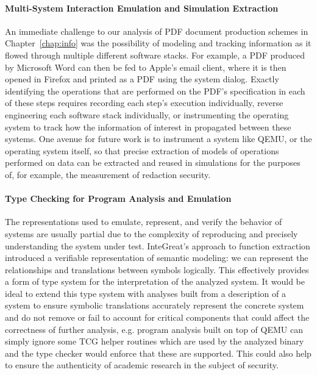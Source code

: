 \paragraph{Multi-System Interaction Emulation and Simulation Extraction}
An immediate challenge to our analysis of PDF document production schemes in Chapter~\ref{chap:info} was the possibility of modeling and tracking information as it flowed through multiple different software stacks.
For example, a PDF produced by Microsoft Word can then be fed to Apple's email client, where it is then opened in Firefox and printed as a PDF using the system dialog.
Exactly identifying the operations that are performed on the PDF's specification in each of these steps requires recording each step's execution individually, reverse engineering each software stack individually, or instrumenting the operating system to track how the information of interest in propagated between these systems.
One avenue for future work is to instrument a system like QEMU, or the operating system itself, so that precise extraction of models of operations performed on data can be extracted and reused in simulations for the purposes of, for example, the measurement of redaction security.

\paragraph{Type Checking for Program Analysis and Emulation}
The representations used to emulate, represent, and verify the behavior of systems are usually partial due to the complexity of reproducing and precisely understanding the system under test.
InteGreat's approach to function extraction introduced a verifiable representation of semantic modeling: we can represent the relationships and translations between symbols logically.
This effectively provides a form of type system for the interpretation of the analyzed system.
It would be ideal to extend this type system with analyses built from a description of a system to ensure symbolic translations accurately represent the concrete system and do not remove or fail to account for critical components that could affect the correctness of further analysis, e.g. program analysis built on top of QEMU can simply ignore some TCG helper routines which are used by the analyzed binary and the type checker would enforce that these are supported.
This could also help to ensure the authenticity of academic research in the subject of security.

